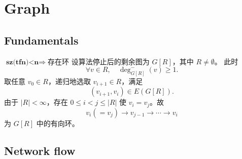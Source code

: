 \chapter{Graph}

\section{Fundamentals}
	\begin{lecture}{$\textbf{sz(tfn)<n}\Rightarrow$存在环}
		设算法停止后的剩余图为 $G[R]$，其中 $R\ne\emptyset$。
		此时
		\[
		\forall v\in R,\quad \deg^-_{G[R]}(v)\ge 1.
		\]
		取任意 $v_0\in R$，递归地选取 $v_{i+1}\in R$，满足
		\[
		(v_{i+1},v_i)\in E(G[R]).
		\]
		由于 $|R|<\infty$，存在 $0\le i<j\le |R|$ 使 $v_i=v_j$。故
		\[
		v_i(=v_j)\to v_{j-1}\to\cdots\to v_i
		\]
		为 $G[R]$ 中的有向环。
	\end{lecture}

\section{Network flow}





